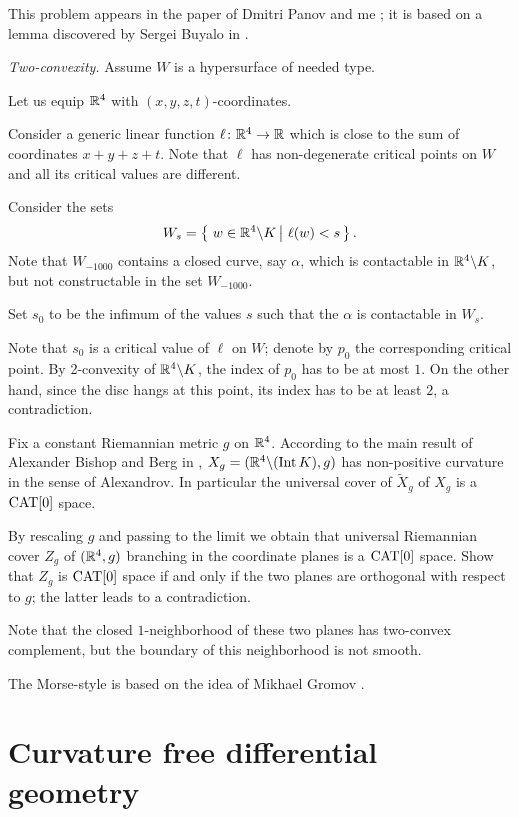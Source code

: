 This problem appears in the paper of Dmitri Panov and me \cite[see][]{panov-petrunin}; 
it is based on a lemma discovered by Sergei Buyalo in \cite{buyalo}.

\textit{Two-convexity.}
Assume $W$ is a hypersurface of needed type.

Let us equip $\mathbb{R}^4$ with $(x,y,z,t)$-coordinates.

Consider a generic linear function $\ell\colon\mathbb{R}^4\to\mathbb{R}$
which is close to the sum of coordinates $x+y+z+t$.
Note that $\ell$
has non-degenerate critical points on $W$ and all its critical values are different.

Consider the sets 
$$W_s=\set{w\in \RR^4\backslash K}{\ell(w)<s}.$$
Note that $W_{-1000}$ contains a closed curve, say $\alpha$, 
which is contactable in $\mathbb{R}^4\backslash K$, 
but not constructable in the set $W_{-1000}$.

Set $s_0$ to be the infimum of the values $s$ such that
the $\alpha$ is contactable in $W_s$.

Note that $s_0$ is a critical value of $\ell$ on $W$;
denote by $p_0$ the corresponding critical point.
By 2-convexity of $\mathbb{R}^4\backslash K$,
the index of $p_0$ has to be at most $1$.
On the other hand, since the disc hangs at this point,
its index has to be at least $2$,
 a contradiction.

Fix a constant Riemannian metric $g$ on $\mathbb{R}^4$.
According to the main result of Alexander Bishop and Berg in \cite{ABB}, $X_g=(\mathbb{R}^4\backslash (\operatorname{\rm Int}\nolimits K),g)$ has non-positive curvature in the sense of Alexandrov.
In particular the universal cover of $\tilde X_g$ of $X_g$ is a $\operatorname{\rm CAT}\nolimits[0]$ space.

By rescaling $g$ and passing to the limit we obtain that universal Riemannian cover $Z_g$ of $(\mathbb{R}^4,g)$ branching in the coordinate planes is a $\operatorname{\rm CAT}\nolimits[0]$ space.
Show that $Z_g$ is $\operatorname{\rm CAT}\nolimits[0]$ space if and only if the two planes are orthogonal with respect to $g$;
the latter leads to a contradiction.

Note that the closed $1$-neighborhood of these two planes has two-convex complement, but the boundary of this neighborhood is not smooth.

The Morse-style is based on the idea of Mikhael Gromov \cite[see][\S\textonehalf]{gromov-SGMC}.

\section*{Curvature free differential geometry}

